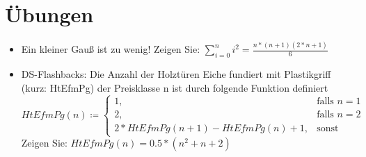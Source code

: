 \documentclass[hidelinks]{article}
\theoremstyle{plain}
\theoremstyle{definition}
\theoremstyle{rem}
\begin{document}
\begin{sloppypar}
\section{Übungen}
\begin{itemize}
\item Ein kleiner Gauß ist zu wenig! Zeigen Sie: $\sum_{i=0}^{n}i^2=\frac{n*(n+1)(2*n+1)}{6}$
\item DS-Flashbacks: Die Anzahl der Holztüren Eiche fundiert mit Plastikgriff (kurz: HtEfmPg) der Preisklasse n ist durch folgende Funktion definiert
\begin{equation}
HtEfmPg(n)\coloneqq\begin{cases}
		1, & \text{falls $n=1$}\\
		2, & \text{falls $n=2$}\\
	   	2*HtEfmPg(n+1)-HtEfmPg(n)+1, & \text{sonst}
	\end{cases}
\end{equation}
Zeigen Sie: $HtEfmPg(n)=0.5*(n^2+n+2)$
\end{itemize}
\end{sloppypar}
\end{document}
